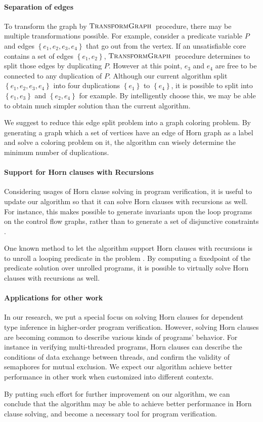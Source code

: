 \paragraph{Separation of edges}
To transform the graph by $\mbox{\sc TransformGraph}$~procedure, there may be
multiple transformations possible.  For example, consider a predicate
variable $P$ and edges $\left\lbrace e_1, e_2, e_3, e_4 \right\rbrace$
that go out from the vertex.  If an unsatisfiable core contains a set
of edges $\left\lbrace e_1, e_2 \right\rbrace$,
$\mbox{\sc TransformGraph}$~procedure determines to split those edges by duplicating
$P$.  However at this point, $e_3$ and $e_4$ are free to be connected
to any duplication of $P$.  Although our current algorithm split
$\left\lbrace e_1, e_2, e_3, e_4 \right\rbrace$ into four duplications
$\left\lbrace e_1 \right\rbrace$ to $\left\lbrace e_4 \right\rbrace$,
it is possible to split into $\left\lbrace e_1, e_3\right\rbrace$ and
$\left\lbrace e_2, e_4 \right\rbrace$ for example.  By intelligently
choose this, we may be able to obtain much simpler solution than the
current algorithm.

We suggest to reduce this edge split problem into a graph coloring
problem.  By generating a graph which a set of vertices have an edge
of Horn graph as a label and solve a coloring problem on it, the
algorithm can wisely determine the minimum number of duplications.


\paragraph{Support for Horn clauses with Recursions}
Considering usages of Horn clause solving in program verification, it
is useful to update our algorithm so that it can solve Horn clauses
with recursions as well.  For instance, this makes possible to generate
invariants upon the loop programs on the control flow graphs, rather
than to generate a set of disjunctive constraints
\cite{conf/pldi/BeyerHMR07}.

One known method to let the algorithm support Horn clauses with
recursions is to unroll a looping predicate in the problem
\cite{conf/ppdp/UnnoK09}.  By computing a fixedpoint of the predicate
solution over unrolled programs, it is possible to virtually solve
Horn clauses with recursions as well.


\paragraph{Applications for other work}
In our research, we put a special focus on solving Horn clauses for
dependent type inference in higher-order program verification.
However, solving Horn clauses are becoming common to describe various
kinds of programs' behavior.  For instance in verifying multi-threaded
programs, Horn clauses can describe the conditions of data exchange
between threads, and confirm the validity of semaphores for mutual
exclusion.  We expect our algorithm achieve better performance in
other work when customized into different contexts.

By putting such effort for further improvement on our algorithm, we can
conclude that the algorithm may be able to achieve better performance
in Horn clause solving, and become a necessary tool for program
verification.
